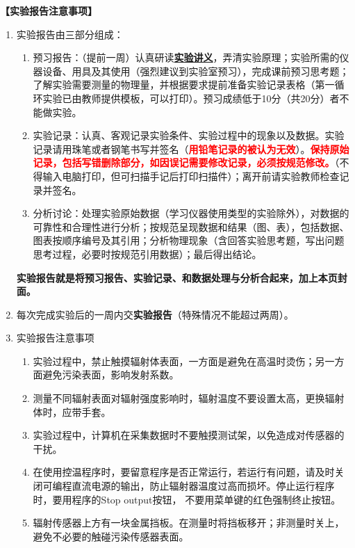 \documentclass[dvipsnames, svgnames,a4paper,11pt]{article}
\begin{document}
\textbf{【实验报告注意事项】}
\begin{enumerate}
	\item 实验报告由三部分组成：
	\begin{enumerate}
		\item 预习报告：（提前一周）认真研读\underline{\textbf{实验讲义}}，弄清实验原理；实验所需的仪器设备、用具及其使用（强烈建议到实验室预习），完成课前预习思考题；了解实验需要测量的物理量，并根据要求提前准备实验记录表格（第一循环实验已由教师提供模板，可以打印）。预习成绩低于10分（共20分）者不能做实验。
	    \item 实验记录：认真、客观记录实验条件、实验过程中的现象以及数据。实验记录请用珠笔或者钢笔书写并签名（\textcolor{red}{\textbf{用铅笔记录的被认为无效}}）。\textcolor{red}{\textbf{保持原始记录，包括写错删除部分，如因误记需要修改记录，必须按规范修改。}}（不得输入电脑打印，但可扫描手记后打印扫描件）；离开前请实验教师检查记录并签名。
	    \item 分析讨论：处理实验原始数据（学习仪器使用类型的实验除外），对数据的可靠性和合理性进行分析；按规范呈现数据和结果（图、表），包括数据、图表按顺序编号及其引用；分析物理现象（含回答实验思考题，写出问题思考过程，必要时按规范引用数据）；最后得出结论。
	\end{enumerate}
	\textbf{实验报告就是将预习报告、实验记录、和数据处理与分析合起来，加上本页封面。}
	\item 每次完成实验后的一周内交\textbf{实验报告}（特殊情况不能超过两周）。
	\item 实验报告注意事项
		\begin{enumerate}[label=\roman*.]
			\item 实验过程中，禁止触摸辐射体表面，一方面是避免在高温时烫伤；另一方面避免污染表面，影响发射系数。
			\item 测量不同辐射表面对辐射强度影响时，辐射温度不要设置太高，更换辐射体时，应带手套。
			\item 实验过程中，计算机在采集数据时不要触摸测试架，以免造成对传感器的干扰。
			\item 在使用控温程序时，要留意程序是否正常运行，若运行有问题，请及时关闭可编程直流电源的输出，防止辐射器温度过高而损坏。停止运行程序时，要用程序的Stop output按钮， 不要用菜单键的红色强制终止按钮。
			\item 辐射传感器上方有一块金属挡板。在测量时将挡板移开；非测量时关上，避免不必要的触碰污染传感器表面。
		\end{enumerate}
\end{enumerate}


\clearpage
\tableofcontents
\clearpage
\end{document}
